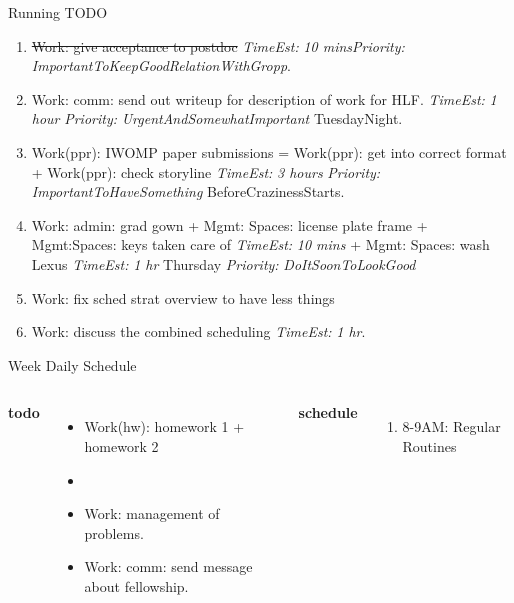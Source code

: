 \documentclass[serif, mathserif, final]{beamer}
\newcommand{\doneTask}[1]{\tiny \item \tiny \sout{#1}}
\newcommand{\te}[1]{\textit{TimeEst:} \textit{#1}}
\newcommand{\prio}[1]{\textit{Priority:} \textit{#1}}
\newcommand{\dl}[1]{#1}
\begin{document}
\begin{frame}{}
\begin{columns}
\begin{column}{0.50\linewidth}
  \begin{block}{Running TODO} %
    \begin{enumerate}
    \doneTask{ Work: give acceptance to postdoc } \te{10
      mins}\prio{ImportantToKeepGoodRelationWithGropp}. 
      \small \item \small Work: comm: send out writeup for description
      of work for HLF. \te{1 hour} \prio{UrgentAndSomewhatImportant}
      \dl{TuesdayNight}.  
    \item \small Work(ppr): IWOMP paper submissions  =  Work(ppr): get into
      correct format  + Work(ppr): check storyline   \te{3 hours} 
      \prio{ImportantToHaveSomething} \dl{BeforeCrazinessStarts}. 
      \item \small  Work: admin: grad gown  + Mgmt: Spaces: license plate frame  + Mgmt:Spaces:
        keys taken care of \te{10 mins} + Mgmt: Spaces: wash
        Lexus \te{1 hr} \dl{Thursday} \prio{DoItSoonToLookGood} 
      \item \small Work: fix sched strat overview to have less things 
      \item \small Work: discuss the combined scheduling \te{1 hr}.

    \end{enumerate}
  \end{block} 

  \begin{block}{Week Daily Schedule}
    \begin{columns} 
      \textbf{\small todo} \\ 
      \begin{itemize}
        \tiny \item \tiny Work(hw): homework 1  + homework 2 

        \tiny \item \tiny 
      \item \tiny Work: management of problems.
      \item \tiny Work: comm: send message about fellowship.
      \end{itemize} 
  \textbf{\small schedule} \\
  \begin{enumerate} 
    \tiny \item \tiny 8-9AM: Regular Routines 
  \end{enumerate} 


\end{columns}
\end{block}
\end{column}
\end{columns}
\end{frame}
\end{document}
